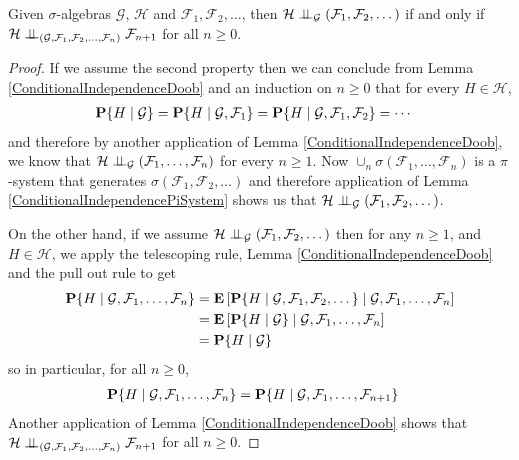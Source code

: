 \begin{lem}\label{ConditionalIndependenceChainRule}Given $\sigma$-algebras $\mathcal{G}$, $\mathcal{H}$ and
  $\mathcal{F}_1, \mathcal{F}_2, \dots$, then
  $\cindependent{\mathcal{H}}{\left( \mathcal{F}_1, \mathcal{F}_2,
      \dots \right)}{\mathcal{G}}$ if and only if $\cindependent{\mathcal{H}}{ \mathcal{F}_{n+1}}{\left(  \mathcal{G},\mathcal{F}_1, \mathcal{F}_2,
      \dots , \mathcal{F}_n\right)}$ for all $n \geq 0$.
\end{lem}
\begin{proof}
If we assume the second property then we can conclude from Lemma
\ref{ConditionalIndependenceDoob} and an induction on $n \geq 0$ that
for every $H \in \mathcal{H}$,
\begin{align*}
\cprobability{\mathcal{G}}{H} &= 
\cprobability{\mathcal{G}, \mathcal{F}_1}{H} = 
\cprobability{\mathcal{G}, \mathcal{F}_1, \mathcal{F}_2}{H} = \cdots
\end{align*}
and therefore by another application of Lemma
\ref{ConditionalIndependenceDoob}, we know that
$\cindependent{\mathcal{H}}{\left (\mathcal{F}_1, \dots,
    \mathcal{F}_n\right)}{\mathcal{G}}$ for every $n \geq 1$.  Now
$\cup_n \sigma(\mathcal{F}_1, \dots, \mathcal{F}_n)$ is a $\pi$-system that generates
$\sigma(\mathcal{F}_1, \mathcal{F}_2, \dots)$ and therefore
application of Lemma \ref{ConditionalIndependencePiSystem} shows us
that  $\cindependent{\mathcal{H}}{\left( \mathcal{F}_1, \mathcal{F}_2,
      \dots \right)}{\mathcal{G}}$.

On the other hand, if we assume $\cindependent{\mathcal{H}}{\left( \mathcal{F}_1, \mathcal{F}_2,
      \dots \right)}{\mathcal{G}}$ then for any $n \geq 1$, and $H \in
  \mathcal{H}$, we apply the telescoping rule, Lemma
  \ref{ConditionalIndependenceDoob} and the pull out rule to get
\begin{align*}
\cprobability{\mathcal{G}, \mathcal{F}_1, \dots, \mathcal{F}_n}{H} &=
\cexpectationlong{\mathcal{G}, \mathcal{F}_1, \dots,
  \mathcal{F}_n}{\cprobability{\mathcal{G}, \mathcal{F}_1,
    \mathcal{F}_2, \dots }{H}} \\
&=\cexpectationlong{\mathcal{G}, \mathcal{F}_1, \dots,
  \mathcal{F}_n}{\cprobability{\mathcal{G}}{H}} \\
&=\cprobability{\mathcal{G}}{H}
\end{align*}
so in particular, for all $n \geq 0$,
\begin{align*}
\cprobability{\mathcal{G}, \mathcal{F}_1, \dots, \mathcal{F}_n}{H} &= \cprobability{\mathcal{G}, \mathcal{F}_1, \dots, \mathcal{F}_{n+1}}{H}
\end{align*}
Another application of Lemma \ref{ConditionalIndependenceDoob} shows
that $\cindependent{\mathcal{H}}{ \mathcal{F}_{n+1}}{\left(  \mathcal{G},\mathcal{F}_1, \mathcal{F}_2,
      \dots , \mathcal{F}_n\right)}$ for all $n \geq 0$.
\end{proof}

